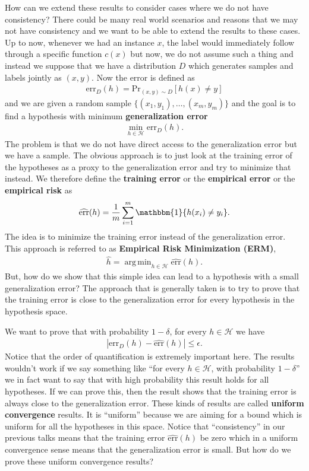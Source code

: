 \documentclass[10pt ]{article}
\DeclareMathOperator*{\argminA}{arg\,min}
\begin{document}
How can we extend these results to consider cases where we do not have consistency? There could be many real world scenarios and reasons that we may not have consistency and we want to be able to extend the results to these cases. Up to now, whenever we had an instance $x$, the label would immediately follow through a specific function $c(x)$ but now, we do not assume such a thing and instead we suppose that we have a distribution $D$ which generates samples and labels jointly as $(x, y)$. Now the error is defined as 
\begin{align}
\mathrm{err}_D (h) = \mathrm{Pr}_{(x,y)\sim D} \left[ h(x) \neq y \right]
\end{align}
and we are given a random sample $\{(x_1, y_1),\dots, (x_m,y_m)\}$ and the goal is to find a hypothesis with minimum \textbf{generalization error}
\begin{align}
\min_{h \in \mathcal{H}} \mathrm{err}_D (h). 
\end{align}
The problem is that we do not have direct access to the generalization error but we have a sample. The obvious approach is to just look at the training error of the hypotheses as a proxy to the generalization error and try to minimize that instead. We therefore define the \textbf{training error} or the \textbf{empirical error} or the \textbf{empirical risk} as 
\begin{align}
\widehat{\mathrm{err}}(h) = \frac{1}{m} \sum_{i=1}^m \mathbbm{1}\{h(x_i) \neq y_i\}.
\label{eq_training_err_def}
\end{align}
The idea is to minimize the training error instead of the generalization error. This approach is referred to as \textbf{Empirical Risk Minimization (ERM)}, 
\begin{align}
\hat{h} = \argminA_{h \in \mathcal{H}} \widehat{\mathrm{err}}(h). 
\end{align}
But, how do we show that this simple idea can lead to a hypothesis with a small generalization error? The approach that is generally taken is to try to prove that the training error is close to the generalization error for every hypothesis in the hypothesis space. 

We want to prove that with probability $1-\delta$, for every $h 
\in \mathcal{H}$ we have 
\begin{align}
|\mathrm{err}_D (h) - \widehat{\mathrm{err}}(h)| \le \epsilon.
\end{align}
Notice that the order of quantification is extremely important here. The results wouldn't work if we say something like ``for every $h \in \mathcal{H}$, with probability $1-\delta$'' we in fact want to say that with high probability this result holds for all hypotheses. If we can prove this, then the result shows that the training error is always close to the generalization error. These kinds of results are called \textbf{uniform convergence} results. It is ``uniform'' because we are aiming for a bound which is uniform for all the hypotheses in this space. Notice that ``consistency'' in our previous talks means that the training error $ \widehat{\mathrm{err}}(h)$ be zero which in a uniform convergence sense means that the generalization error is small. But how do we prove these uniform convergence results? 
\end{document}

